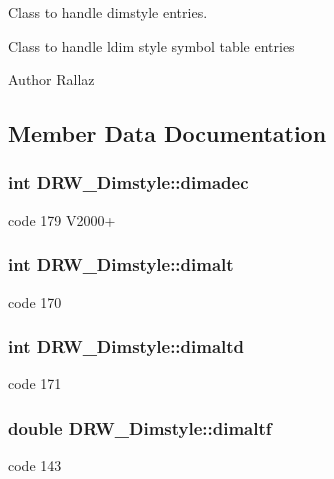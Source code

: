Class to handle dimstyle entries. 

Class to handle ldim style symbol table entries \begin{DoxyAuthor}{Author}
Rallaz 
\end{DoxyAuthor}


\subsection{Member Data Documentation}
\hypertarget{class_d_r_w___dimstyle_a3954f6b5e068cb1fd157231af5680e81}{}
\subsubsection[{dimadec}]{\setlength{\rightskip}{0pt plus 5cm}int D\+R\+W\+\_\+\+Dimstyle\+::dimadec}\label{class_d_r_w___dimstyle_a3954f6b5e068cb1fd157231af5680e81}
code 179 V2000+ \hypertarget{class_d_r_w___dimstyle_a1e1e9ec596e0d157c75fffd91bd20df2}{}
\subsubsection[{dimalt}]{\setlength{\rightskip}{0pt plus 5cm}int D\+R\+W\+\_\+\+Dimstyle\+::dimalt}\label{class_d_r_w___dimstyle_a1e1e9ec596e0d157c75fffd91bd20df2}
code 170 \hypertarget{class_d_r_w___dimstyle_aefeeeccbe986c9484b59024c8bc40a98}{}
\subsubsection[{dimaltd}]{\setlength{\rightskip}{0pt plus 5cm}int D\+R\+W\+\_\+\+Dimstyle\+::dimaltd}\label{class_d_r_w___dimstyle_aefeeeccbe986c9484b59024c8bc40a98}
code 171 \hypertarget{class_d_r_w___dimstyle_a0ccbe896838b874d8bdf263b48e7cee6}{}
\subsubsection[{dimaltf}]{\setlength{\rightskip}{0pt plus 5cm}double D\+R\+W\+\_\+\+Dimstyle\+::dimaltf}\label{class_d_r_w___dimstyle_a0ccbe896838b874d8bdf263b48e7cee6}
code 143 \hypertarget{class_d_r_w___dimstyle_a023f32391a544dc81aabadd2e163f90d}{}

